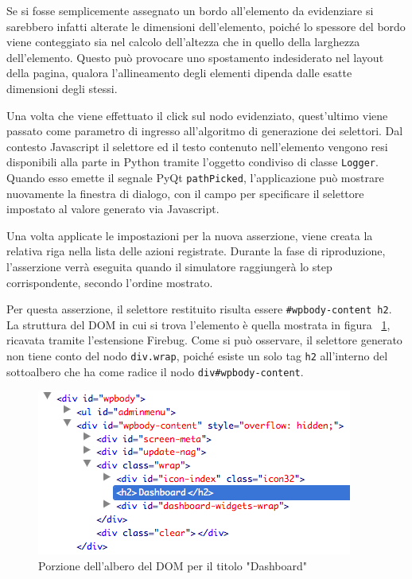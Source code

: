 Se si fosse semplicemente assegnato un bordo all'elemento da evidenziare si sarebbero infatti alterate le dimensioni dell'elemento, poiché lo spessore del bordo viene conteggiato sia nel calcolo dell'altezza che in quello della larghezza dell'elemento. Questo può provocare uno spostamento indesiderato nel layout della pagina, qualora l'allineamento degli elementi dipenda dalle esatte dimensioni degli stessi.

Una volta che viene effettuato il click sul nodo evidenziato, quest'ultimo viene passato come parametro di ingresso all'algoritmo di generazione dei selettori. Dal contesto Javascript il selettore ed il testo contenuto nell'elemento vengono resi disponibili alla parte in Python tramite l'oggetto condiviso di classe \verb|Logger|. Quando esso emette il segnale PyQt \verb|pathPicked|, l'applicazione può mostrare nuovamente la finestra di dialogo, con il campo per specificare il selettore impostato al valore generato via Javascript.

Una volta applicate le impostazioni per la nuova asserzione, viene creata la relativa riga nella lista delle azioni registrate. Durante la fase di riproduzione, l'asserzione verrà eseguita quando il simulatore raggiungerà lo step corrispondente, secondo l'ordine mostrato.

Per questa asserzione, il selettore restituito risulta essere \verb|#wpbody-content h2|. La struttura del DOM in cui si trova l'elemento è quella mostrata in figura ~\ref{fig:dashboardH2DOM}, ricavata tramite l'estensione Firebug. Come si può osservare, il selettore generato non tiene conto del nodo \verb|div.wrap|, poiché esiste un solo tag \verb|h2| all'interno del sottoalbero che ha come radice il nodo \verb|div#wpbody-content|. 

\begin{figure}[htbp]
\begin{center}
\includegraphics{images/wp_tour/7_dashboard_h2_firebug.png}
\caption{Porzione dell'albero del DOM per il titolo "Dashboard"}
\label{fig:dashboardH2DOM}
\end{center}
\end{figure}


